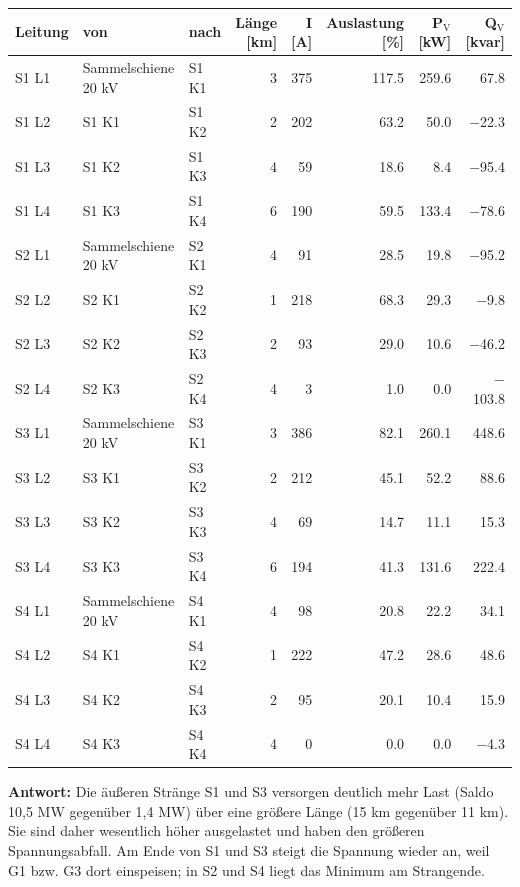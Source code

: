 \documentclass[11pt,a4paper]{article}
\begin{document}
\begin{table}[H]
\centering
\begin{adjustbox}{max width=\linewidth}
\begin{tabular}{lllrrrrr}
\toprule
\textbf{Leitung} & \textbf{von} & \textbf{nach} & \thead{Länge \\ {[km]}} & \thead{I \\ {[A]}} & \thead{Auslastung \\ {[\%]}} & \thead{P$_\mathrm{V}$ \\ {[kW]}} & \thead{Q$_\mathrm{V}$ \\ {[kvar]}} \\
\midrule
S1 L1 & Sammelschiene 20 kV & S1 K1 & 3 & 375 & 117.5 & 259.6 & 67.8 \\
S1 L2 & S1 K1 & S1 K2 & 2 & 202 & 63.2 & 50.0 & $-$22.3 \\
S1 L3 & S1 K2 & S1 K3 & 4 & 59 & 18.6 & 8.4 & $-$95.4 \\
S1 L4 & S1 K3 & S1 K4 & 6 & 190 & 59.5 & 133.4 & $-$78.6 \\
S2 L1 & Sammelschiene 20 kV & S2 K1 & 4 & 91 & 28.5 & 19.8 & $-$95.2 \\
S2 L2 & S2 K1 & S2 K2 & 1 & 218 & 68.3 & 29.3 & $-$9.8 \\
S2 L3 & S2 K2 & S2 K3 & 2 & 93 & 29.0 & 10.6 & $-$46.2 \\
S2 L4 & S2 K3 & S2 K4 & 4 & 3 & 1.0 & 0.0 & $-$103.8 \\
S3 L1 & Sammelschiene 20 kV & S3 K1 & 3 & 386 & 82.1 & 260.1 & 448.6 \\
S3 L2 & S3 K1 & S3 K2 & 2 & 212 & 45.1 & 52.2 & 88.6 \\
S3 L3 & S3 K2 & S3 K3 & 4 & 69 & 14.7 & 11.1 & 15.3 \\
S3 L4 & S3 K3 & S3 K4 & 6 & 194 & 41.3 & 131.6 & 222.4 \\
S4 L1 & Sammelschiene 20 kV & S4 K1 & 4 & 98 & 20.8 & 22.2 & 34.1 \\
S4 L2 & S4 K1 & S4 K2 & 1 & 222 & 47.2 & 28.6 & 48.6 \\
S4 L3 & S4 K2 & S4 K3 & 2 & 95 & 20.1 & 10.4 & 15.9 \\
S4 L4 & S4 K3 & S4 K4 & 4 & 0 & 0.0 & 0.0 & $-$4.3 \\
\bottomrule
\end{tabular}
\end{adjustbox}
\end{table}

\textbf{Antwort:} Die äußeren Stränge S1 und S3 versorgen deutlich mehr Last (Saldo 10,5 MW gegenüber 1,4 MW) über eine größere Länge (15 km gegenüber 11 km). Sie sind daher wesentlich höher ausgelastet und haben den größeren Spannungsabfall. Am Ende von S1 und S3 steigt die Spannung wieder an, weil G1 bzw. G3 dort einspeisen; in S2 und S4 liegt das Minimum am Strangende.
\end{document}
